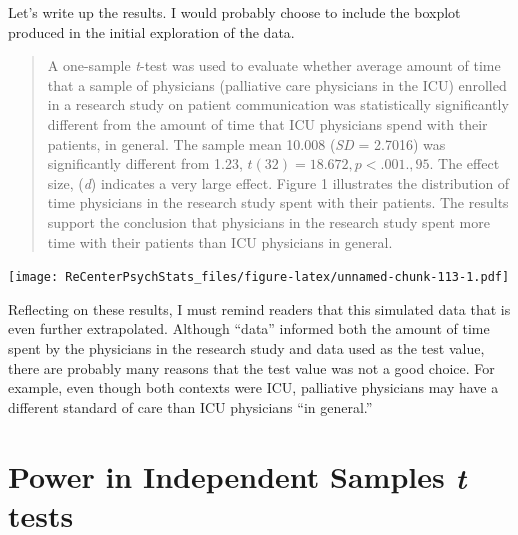 \documentclass[
  11pt,
]{book}
\newenvironment{Shaded}{\begin{snugshade}}{\end{snugshade}}
\newcommand{\AttributeTok}[1]{\textcolor[rgb]{0.77,0.63,0.00}{#1}}
\newcommand{\ConstantTok}[1]{\textcolor[rgb]{0.00,0.00,0.00}{#1}}
\newcommand{\FunctionTok}[1]{\textcolor[rgb]{0.00,0.00,0.00}{#1}}
\newcommand{\NormalTok}[1]{#1}
\newcommand{\SpecialCharTok}[1]{\textcolor[rgb]{0.00,0.00,0.00}{#1}}
\newcommand{\StringTok}[1]{\textcolor[rgb]{0.31,0.60,0.02}{#1}}
\begin{document}
Let's write up the results. I would probably choose to include the boxplot produced in the initial exploration of the data.

\begin{quote}
A one-sample \emph{t}-test was used to evaluate whether average amount of time that a sample of physicians (palliative care physicians in the ICU) enrolled in a research study on patient communication was statistically significantly different from the amount of time that ICU physicians spend with their patients, in general. The sample mean 10.008 (\emph{SD} = 2.7016) was significantly different from 1.23, \(t(32) = 18.672, p < .001., 95%
\). The effect size, (\emph{d}) indicates a very large effect. Figure 1 illustrates the distribution of time physicians in the research study spent with their patients. The results support the conclusion that physicians in the research study spent more time with their patients than ICU physicians in general.
\end{quote}

\begin{Shaded}
\end{Shaded}

\texttt{[image: ReCenterPsychStats\_files/figure-latex/unnamed-chunk-113-1.pdf]}

Reflecting on these results, I must remind readers that this simulated data that is even further extrapolated. Although ``data'' informed both the amount of time spent by the physicians in the research study and data used as the test value, there are probably many reasons that the test value was not a good choice. For example, even though both contexts were ICU, palliative physicians may have a different standard of care than ICU physicians ``in general.''

\hypertarget{power-in-independent-samples-t-tests}{%
\section{\texorpdfstring{Power in Independent Samples \emph{t} tests}{Power in Independent Samples t tests}}\label{power-in-independent-samples-t-tests}}
\end{document}
